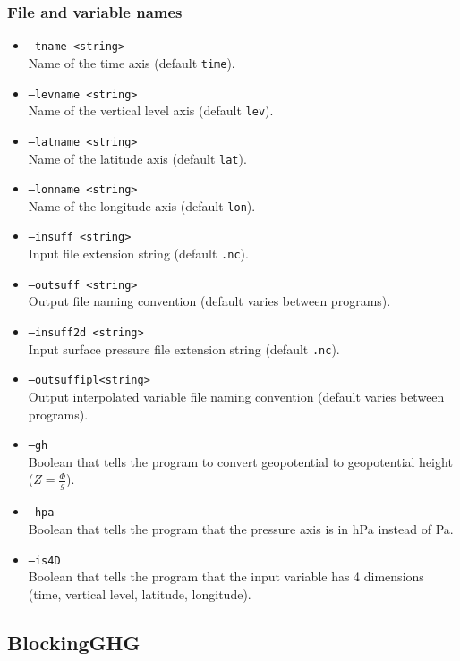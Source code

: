 \documentclass{article}
\begin{document}
\subsubsection{File and variable names}
\begin{itemize}
\item[] \texttt{--tname <string>}\\Name of the time axis (default \texttt{time}).
\item[] \texttt{--levname <string>}\\Name of the vertical level axis (default \texttt{lev}).
\item[]\texttt{--latname <string>}\\Name of the latitude axis (default \texttt{lat}).
\item[]\texttt{--lonname <string>}\\Name of the longitude axis (default \texttt{lon}).
\item[]\texttt{--insuff <string>}\\Input file extension string (default \texttt{.nc}).
\item[]\texttt{--outsuff <string>}\\Output file naming convention (default varies between programs).
\item[]\texttt{--insuff2d <string>}\\Input surface pressure file extension string (default \texttt{.nc}).
\item[] \texttt{--outsuffipl<string>}\\Output interpolated variable file naming convention (default varies between programs).
\item[] \texttt{--gh}\\Boolean that tells the program to convert geopotential to geopotential height ($Z=\frac{\Phi}{g}$).
\item[] \texttt{--hpa}\\Boolean that tells the program that the pressure axis is in hPa instead of Pa.
\item[] \texttt{--is4D}\\Boolean that tells the program that the input variable has 4 dimensions (time, vertical level, latitude, longitude).
\end{itemize}

\subsection{BlockingGHG}\label{ghg}
\end{document}
